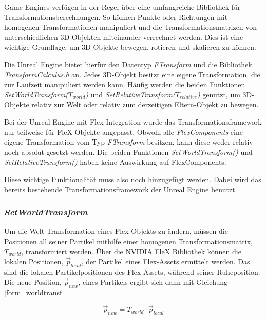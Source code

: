 Game Engines verfügen in der Regel über eine umfangreiche Bibliothek für Transformationsberechnungen. So können Punkte oder Richtungen mit homogenen Transformationen manipuliert und die Transformationsmatrizen von unterschiedlichen 3D-Objekten miteinander verrechnet werden.
Dies ist eine wichtige Grundlage, um 3D-Objekte bewegen, rotieren und skalieren zu können. 

Die Unreal Engine bietet hierfür den Datentyp \textit{FTransform} und die Bibliothek  \linebreak \textit{TransformCalculus.h} an. Jedes 3D-Objekt besitzt eine eigene Transformation, die zur Laufzeit manipuliert werden kann. Häufig werden die beiden Funktionen \newline \textit{SetWorldTransform($T_{world}$)} und \textit{SetRelativeTransform($T_{relative}$)} genutzt, um 3D-Objekte relativ zur Welt oder relativ zum derzeitigen Eltern-Objekt zu bewegen.

Bei der Unreal Engine mit Flex Integration wurde das Transformationsframework nur teilweise für FleX-Objekte angepasst. Obwohl alle \textit{FlexComponents} eine eigene Transformation vom Typ \textit{FTransform} besitzen, kann diese weder relativ noch absolut gesetzt werden. Die beiden Funktionen \textit{SetWorldTransform()} und  \linebreak \textit{SetRelativeTransform()} haben keine Auswirkung auf FlexComponents.

Diese wichtige Funktionalität muss also noch hinzugefügt werden. Dabei wird das bereits bestehende Transformationsframework der Unreal Engine benutzt.

\subsubsection{\textit{SetWorldTransform}}

Um die Welt-Transformation eines Flex-Objekts zu ändern, müssen die Positionen all seiner Partikel mithilfe einer homogenen Transformationsmatrix, $T_{world}$, transformiert werden. Über die NVIDIA FleX Bibliothek können die lokalen Positionen, $\vec{p}_{local}$, der Partikel eines Flex-Assets ermittelt werden. Das sind die lokalen Partikelpositionen des Flex-Assets, während seiner Ruheposition. Die neue Position, $\vec{p}_{new}$, eines Partikels ergibt sich dann mit Gleichung \ref{form_worldtransf}.

\begin{equation}
\vec{p}_{new} = T_{world} \cdot \vec{p}_{local}
\label{form_worldtransf}
\end{equation}

